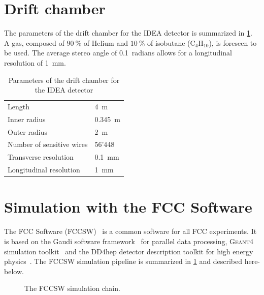 \documentclass[conference]{IEEEtran}
\begin{document}
\section{Drift chamber}
The parameters of the drift chamber for the IDEA detector is summarized in \cref{driftChamberParams}. A gas, composed of $90~\%$ of Helium and $10~\%$ of isobutane ($\text{C}_{4}\text{H}_{10}$), is foreseen to be used. The average stereo angle of 0.1~radians allows for a longitudinal resolution of 1~mm.

\begin{table}[!t]
	\renewcommand{\arraystretch}{1.3}
	\caption{Parameters of the drift chamber for the IDEA detector}
	\label{driftChamberParams}
	\centering
	\begin{tabular}{l l}
		\toprule
			Length & 4~m \\
      Inner radius & 0.345~m \\
      Outer radius & 2~m\\
      Number of sensitive wires & 56'448 \\
      Transverse resolution & 0.1~mm \\
			Longitudinal resolution & 1~mm \\
		\bottomrule
	\end{tabular}
\end{table}

\section{Simulation with the FCC Software}

The FCC Software (FCCSW)~\cite{FCCSW} is a common software for all FCC experiments. It is based on the Gaudi software framework~\cite{Gaudi} for parallel data processing, \textsc{Geant4} simulation toolkit~\cite{Geant4} and the DD4hep detector description toolkit for high energy physics~\cite{DD4hep}. The FCCSW simulation pipeline is summarized in \cref{simu_chain} and described here-below.

\begin{figure}[!t]
\centering
\caption{The FCCSW simulation chain.}
\label{simu_chain}
\end{figure}
\end{document}
